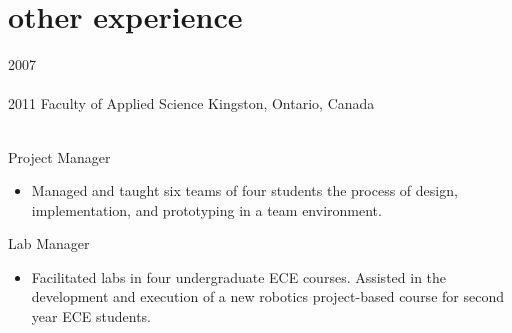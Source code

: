 
\section{other experience}
\begin{entrylist}
\entry
  {2007\\\faChevronDown\\2011}
  {Faculty of Applied Science}
  {Kingston, Ontario, Canada}
  {\\
  Project Manager
  \begin{itemize}[leftmargin=12pt]
    \item Managed and taught six teams of four students the process of design, implementation, and prototyping in a team environment.
  \end{itemize}
  Lab Manager
  \begin{itemize}[leftmargin=12pt]
    \item Facilitated labs in four undergraduate ECE courses. Assisted in the development and execution of a new robotics project-based course for second year ECE students.
  \end{itemize}}
\end{entrylist}